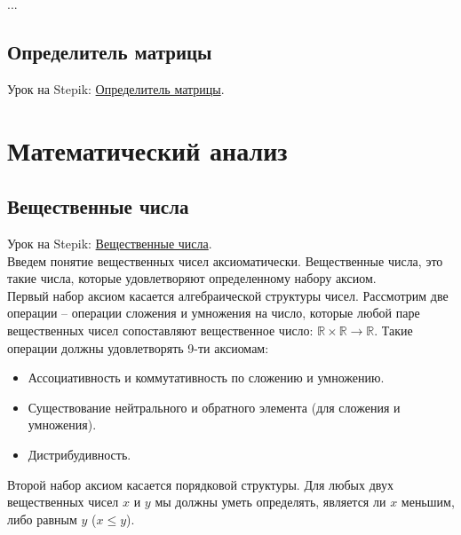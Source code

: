 \documentclass{article}
\begin{document}
...

\subsection{Определитель матрицы}

Урок на Stepik: \href{https://stepik.org/lesson/44077/step/1?unit=21901}{Определитель матрицы}.

\section{Математический анализ}

\subsection{Вещественные числа}

Урок на Stepik: \href{https://stepik.org/lesson/28445/step/3?unit=9589}{Вещественные числа}. \\

Введем понятие вещественных чисел аксиоматически. Вещественные числа, это такие числа, которые удовлетворяют определенному набору аксиом. \\

Первый набор аксиом касается алгебраической структуры чисел. Рассмотрим две операции -- операции сложения и умножения на число, которые любой паре вещественных чисел сопоставляют вещественное число: $\mathbb{R} \times \mathbb{R} \to \mathbb{R}$. Такие операции должны удовлетворять 9-ти аксиомам:

\begin{itemize}
	\item Ассоциативность и коммутативность по сложению и умножению.
	\item Существование нейтрального и обратного элемента (для сложения и умножения).
	\item Дистрибудивность.
\end{itemize}

Второй набор аксиом касается порядковой структуры. Для любых двух вещественных чисел $x$ и $y$ мы должны уметь определять, является ли $x$ меньшим, либо равным $y$ ($x \le y$). 
\end{document}
